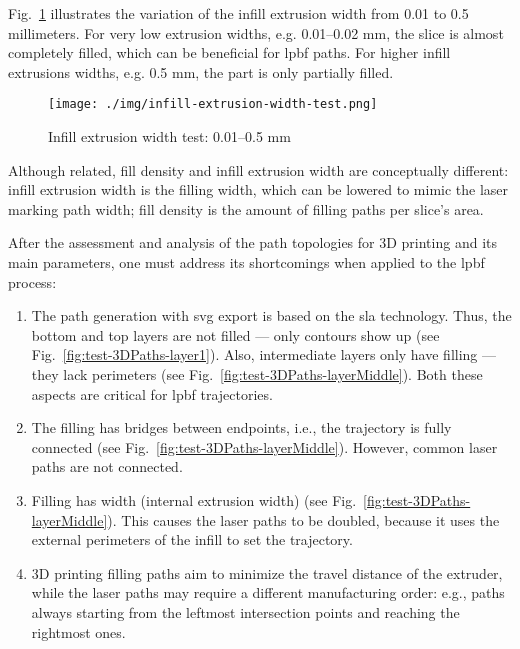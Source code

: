 Fig.~\ref{fig:infill-test} illustrates the variation of the infill extrusion
width from 0.01 to 0.5 millimeters. 
For very low extrusion widths,
e.g. 0.01--0.02 mm, the slice is almost completely filled, which can be
beneficial for \gls{lpbf} paths. For higher infill extrusions widths, e.g. 0.5
mm, the part is only partially filled.

\begin{figure}[!hbt]
  \centering
    \texttt{[image: ./img/infill-extrusion-width-test.png]}
  \caption{Infill extrusion width test: 0.01--0.5 mm}%
\label{fig:infill-test}
\end{figure}

Although related, fill density and infill extrusion width are conceptually
different: infill extrusion width is the filling width, which can be lowered to
mimic the laser marking path width; fill density is the amount of filling paths
per slice's area.

After the assessment and analysis of the path topologies for 3D printing and its main
parameters, one must address its shortcomings when applied to the \gls{lpbf}
process:
\begin{enumerate}
\item The path generation with \gls{svg} export is based on the \gls{sla}
  technology. Thus, the bottom and top layers are not filled --- only contours
  show up (see Fig.~\ref{fig:test-3DPaths-layer1}). Also, intermediate layers only have filling --- they lack
  perimeters (see Fig.~\ref{fig:test-3DPaths-layerMiddle}). Both these aspects are critical for \gls{lpbf} trajectories.
\item The filling has bridges between endpoints, i.e., the trajectory is fully
  connected (see Fig.~\ref{fig:test-3DPaths-layerMiddle}). However, common laser paths are not connected.
\item Filling has width (internal extrusion width) (see Fig.~\ref{fig:test-3DPaths-layerMiddle}). This causes the laser paths
  to be doubled, because it uses the external perimeters of the infill to set
  the trajectory.
\item 3D printing filling paths aim to minimize the travel distance of the
  extruder, while the laser paths may require a different manufacturing order:
  e.g., paths always starting from the leftmost intersection points and reaching
  the rightmost ones.
\end{enumerate}

